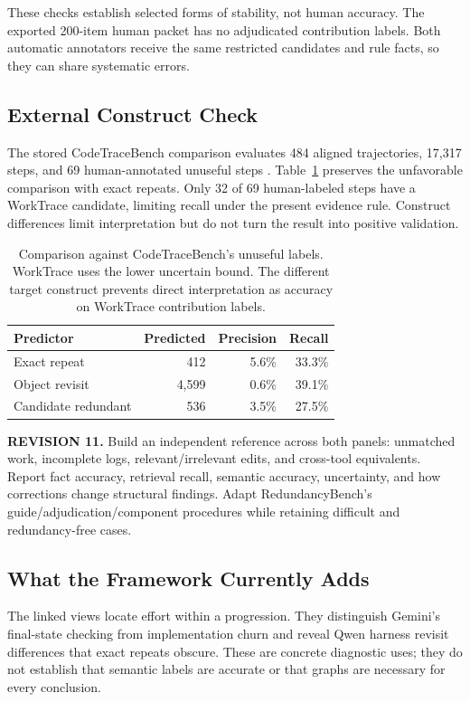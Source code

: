 \documentclass[10pt,a4paper,twocolumn]{article}
\newcommand{\rev}[2]{\par\smallskip\noindent\begin{minipage}{\linewidth}\color{revision}\footnotesize\textbf{REVISION #1.} #2\end{minipage}\par\smallskip}
\begin{document}
These checks establish selected forms of stability, not human accuracy. The exported 200-item human packet has no adjudicated contribution labels. Both automatic annotators receive the same restricted candidates and rule facts, so they can share systematic errors.

\subsection{External Construct Check}
The stored CodeTraceBench comparison evaluates 484 aligned trajectories, 17,317 steps, and 69 human-annotated unuseful steps \citep{codetracebench}. Table~\ref{tab:ctb} preserves the unfavorable comparison with exact repeats. Only 32 of 69 human-labeled steps have a WorkTrace candidate, limiting recall under the present evidence rule. Construct differences limit interpretation but do not turn the result into positive validation.
\begin{table}[t]
\centering\small
\begin{tabular}{lrrr}
\toprule
Predictor & Predicted & Precision & Recall\\
\midrule
Exact repeat & 412 & 5.6\% & 33.3\%\\
Object revisit & 4,599 & 0.6\% & 39.1\%\\
Candidate redundant & 536 & 3.5\% & 27.5\%\\
\bottomrule
\end{tabular}
\caption{Comparison against CodeTraceBench's unuseful labels. WorkTrace uses the lower uncertain bound. The different target construct prevents direct interpretation as accuracy on WorkTrace contribution labels.}
\label{tab:ctb}
\end{table}
\rev{11}{Build an independent reference across both panels: unmatched work, incomplete logs, relevant/irrelevant edits, and cross-tool equivalents. Report fact accuracy, retrieval recall, semantic accuracy, uncertainty, and how corrections change structural findings. Adapt RedundancyBench's guide/adjudication/component procedures while retaining difficult and redundancy-free cases.}

\subsection{What the Framework Currently Adds}
The linked views locate effort within a progression. They distinguish Gemini's final-state checking from implementation churn and reveal Qwen harness revisit differences that exact repeats obscure. These are concrete diagnostic uses; they do not establish that semantic labels are accurate or that graphs are necessary for every conclusion.
\end{document}
